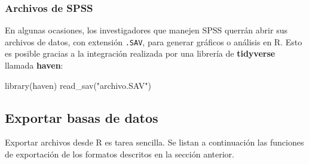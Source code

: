 \documentclass[
]{article}
\newenvironment{Shaded}{\begin{snugshade}}{\end{snugshade}}
\newcommand{\FunctionTok}[1]{\textcolor[rgb]{0.00,0.00,0.00}{#1}}
\newcommand{\NormalTok}[1]{#1}
\newcommand{\StringTok}[1]{\textcolor[rgb]{0.31,0.60,0.02}{#1}}
\theoremstyle{definition}
\theoremstyle{definition}
\theoremstyle{definition}
\theoremstyle{definition}
\theoremstyle{remark}
\begin{document}
\hypertarget{archivos-de-spss}{%
\subsubsection{Archivos de SPSS}\label{archivos-de-spss}}

En algunas ocasiones, los investigadores que manejen SPSS querrán abrir sus archivos de datos, con extensión \texttt{.SAV}, para generar gráficos o análisis en R. Esto es posible gracias a la integración realizada por una librería de \textbf{tidyverse} llamada \textbf{haven}:

\begin{Shaded}
\begin{Highlighting}[]
\FunctionTok{library}\NormalTok{(haven)}
\FunctionTok{read\_sav}\NormalTok{(}\StringTok{"archivo.SAV"}\NormalTok{)}
\end{Highlighting}
\end{Shaded}

\hypertarget{exportar-basas-de-datos}{%
\subsection{Exportar basas de datos}\label{exportar-basas-de-datos}}

Exportar archivos desde R es tarea sencilla. Se listan a continuación las funciones de exportación de los formatos descritos en la sección anterior.
\end{document}
